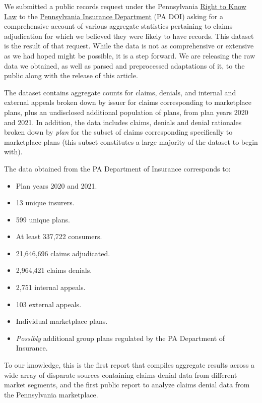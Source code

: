 \documentclass[12pt, a4paper,twoside,parskip=full]{report}
\theoremstyle{plain} %
\theoremstyle{definition} %
\theoremstyle{remark} %
\numberwithin{equation}{chapter}
\begin{document}
\begin{itemize}
\begin{tcolorbox}
			We submitted a public records request under the Pennsylvania \href{https://www.insurance.pa.gov/right-to-know-law/Pages/default.aspx}{Right to Know Law} to the \href{https://www.insurance.pa.gov/Pages/default.aspx}{Pennsylvania Insurance Department} (PA DOI) asking for a comprehensive account of various aggregate statistics pertaining to claims adjudication for which we believed they were likely to have records. This dataset is the result of that request. While the data is not as comprehensive or extensive as we had hoped might be possible, it is a step forward. We are releasing the raw data we obtained, as well as parsed and preprocessed adaptations of it, to the public along with the release of this article.
			
			The dataset contains aggregate counts for claims, denials, and internal and external appeals broken down by issuer for claims corresponding to marketplace plans, plus an undisclosed additional population of plans, from plan years 2020 and 2021. In addition, the data includes claims, denials and denial rationales broken down by \emph{plan} for the subset of claims corresponding specifically to marketplace plans (this subset constitutes a large majority of the dataset to begin with).
			
			The data obtained from the PA Department of Insurance corresponds to:
			
			\begin{itemize}
				\item Plan years 2020 and 2021.
				\item 13 unique insurers.
				\item 599 unique plans.
				\item At least 337,722 consumers.
				\item 21,646,696 claims adjudicated.
				\item 2,964,421 claims denials.
				\item 2,751 internal appeals.
				\item 103 external appeals.
				\item Individual marketplace plans.
				\item \emph{Possibly} additional group plans regulated by the PA Department of Insurance.
			\end{itemize}
		\end{tcolorbox}
	
	
	
		\end{itemize}
	
		
		To our knowledge, this is the first report that compiles aggregate results across a wide array of disparate sources containing claims denial data from different market segments, and the first public report to analyze claims denial data from the Pennsylvania marketplace.
		
\end{document}
